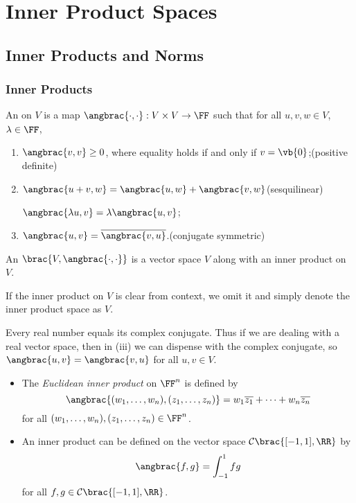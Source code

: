 \chapter{Inner Product Spaces}
\section{Inner Products and Norms}
\subsection{Inner Products}
\begin{definition}
An  on $V$ is a map $\angbrac{\cdot,\cdot}:V\times V\to\FF$ such that for all $u,v,w\in V$, $\lambda\in\FF$,
\begin{enumerate}[label=(\roman*)]
\item $\angbrac{v,v}\ge0$, where equality holds if and only if $v=\vb{0}$;\hfill(positive definite)
\item $\angbrac{u+v,w}=\angbrac{u,w}+\angbrac{v,w}$\hfill(sesquilinear)

$\angbrac{\lambda u,v}=\lambda\angbrac{u,v}$;
\item $\angbrac{u,v}=\overline{\angbrac{v,u}}$.\hfill(conjugate symmetric)
\end{enumerate}
An  $\brac{V,\angbrac{\cdot,\cdot}}$ is a vector space $V$ along with an inner product on $V$.
\end{definition}

\begin{notation}
If the inner product on $V$ is clear from context, we omit it and simply denote the inner product space as $V$.
\end{notation}

\begin{remark}
Every real number equals its complex conjugate. Thus if we are dealing with a real vector space, then in (iii) we can dispense with the complex conjugate, so $\angbrac{u,v}=\angbrac{v,u}$ for all $u,v\in V$.
\end{remark}

\begin{example}
\begin{itemize}
\item The \emph{Euclidean inner product} on $\FF^n$ is defined by
\[\angbrac{(w_1,\dots,w_n),(z_1,\dots,z_n)}=w_1\overline{z_1}+\cdots+w_n\overline{z_n}\]
for all $(w_1,\dots,w_n),(z_1,\dots,z_n)\in\FF^n$.

\item An inner product can be defined on the vector space $\mathcal{C}\brac{[-1,1],\RR}$ by
\[\angbrac{f,g}=\int_{-1}^{1}fg\]
for all $f,g\in\mathcal{C}\brac{[-1,1],\RR}$.
\end{itemize}
\end{example}

